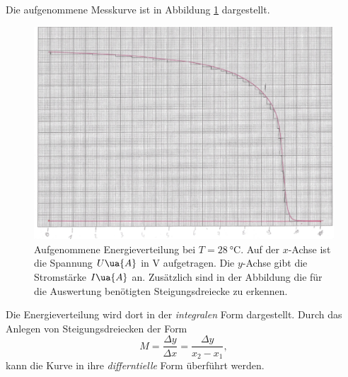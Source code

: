 Die aufgenommene Messkurve ist in Abbildung \ref{fig: messkurve_energie_zim} dargestellt.
\begin{figure}
  \centering
  \includegraphics[width=0.8 \textwidth]{./pics/energieverteilung_zimmer.png}
  \caption{Aufgenommene Energieverteilung bei $T=\SI{28}{\celsius}$. Auf der $x$-Achse ist die Spannung $U\ua{A}$ in $\si{\volt}$ aufgetragen.
          Die $y$-Achse gibt die Stromstärke $I\ua{A}$ an. Zusätzlich sind in der Abbildung die für die Auswertung benötigten Steigungsdreiecke zu erkennen.} %
  \label{fig: messkurve_energie_zim}
\end{figure}
Die Energieverteilung wird dort in der \emph{integralen} Form dargestellt.
Durch das Anlegen von Steigungsdreiecken der Form %
\begin{equation}
  \label{eq:steigung}
    M=\frac{\Delta y}{\Delta x}=\frac{\Delta y}{x_2-x_1},
\end{equation}
kann die Kurve in ihre \emph{differntielle} Form überführt werden. %

